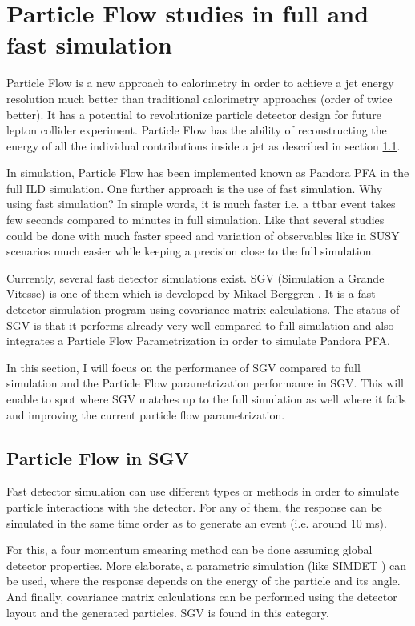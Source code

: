 \chapter{Particle Flow studies in full and fast simulation}

Particle Flow is a new approach to calorimetry in order to achieve a jet energy resolution much better than traditional calorimetry approaches (order of twice better). It has a potential to revolutionize particle detector design for future lepton collider experiment. Particle Flow has the ability of reconstructing the energy of all the individual contributions inside a jet as described in section \ref{}.

In simulation, Particle Flow has been implemented known as Pandora PFA in the full ILD simulation. One further approach is the use of fast simulation. Why using fast simulation? In simple words, it is much faster i.e. a ttbar event takes few seconds compared to minutes in full simulation. Like that several studies could be done with much faster speed and variation of observables like in SUSY scenarios much easier while keeping a precision close to the full simulation.

Currently, several fast detector simulations exist. SGV (Simulation a Grande Vitesse) is one of them which is developed by Mikael Berggren \cite{Berggren2012}. It is a fast detector simulation program using covariance matrix calculations. The status of SGV is that it performs already very well compared to full simulation and also integrates a Particle Flow Parametrization in order to simulate Pandora PFA.

In this section, I will focus on the performance of SGV compared to full simulation and the Particle Flow parametrization performance in SGV. This will enable to spot where SGV matches up to the full simulation as well where it fails and improving the current particle flow parametrization.

\section{Particle Flow in SGV}

Fast detector simulation can use different types or methods in order to simulate particle interactions with the detector. For any of them, the response can be simulated in the same time order as to generate an event (i.e. around 10 ms).

For this, a four momentum smearing method can be done assuming global detector properties. More elaborate, a parametric simulation (like SIMDET \cite{Pohl2002}) can be used, where the response depends on the energy of the particle and its angle.
And finally, covariance matrix calculations can be performed using the detector layout and the generated particles. SGV is found in this category.

